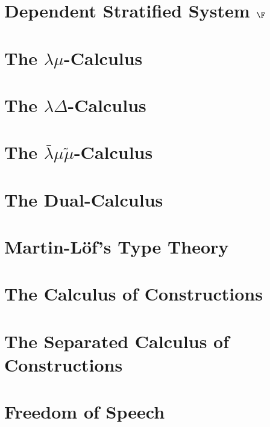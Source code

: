\documentclass[phd,appendix,dedicationpage,ackpage,epigraphpage,figures]{uithesis}
\newcommand{\LBMMT}[0]{\bar{\lambda}\mu\tilde\mu}
\begin{document}

\newpage
\section*{Dependent Stratified System $\F$}
\label{sec:dep_stratified_system_f}
\DepSSFall{}

\section*{The $\lambda\mu$-Calculus}
\label{sec:lamu_all}
\Lamuall{}

\newpage
\section*{The $\lambda\Delta$-Calculus}
\label{sec:lamd_all}
\Lamdall{}

\newpage
\section*{The $\LBMMT$-Calculus}
\label{sec:lbmmt_all}
\LBMMTall{}

\newpage
\section*{The Dual-Calculus}
\label{sec:dc_all}
\DCall{}

\newpage
\section*{Martin-L\"of's Type Theory}
\label{sec:tt_all}
\TTall{}

\newpage
\section*{The Calculus of Constructions}
\label{sec:coc_all}
\CoCall{}

\newpage
\section*{The Separated Calculus of Constructions}
\label{sec:coc_sep_all}
\CoCSall{}

\newpage
\section*{Freedom of Speech}
\label{sec:freedom_of_speech_all}
\FSall{}
\end{document}
